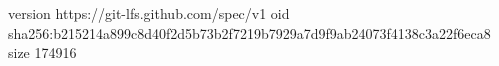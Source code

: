version https://git-lfs.github.com/spec/v1
oid sha256:b215214a899c8d40f2d5b73b2f7219b7929a7d9f9ab24073f4138c3a22f6eca8
size 174916
